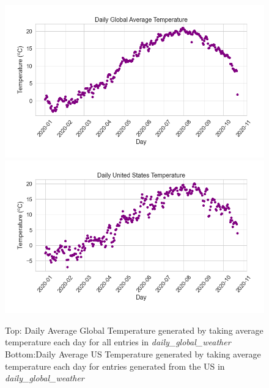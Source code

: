 \begin{figure}
    \centering
    \includegraphics[width=\columnwidth]{figures/DailyAveTemp.png}
    \includegraphics[width=\columnwidth]{figures/DailyAveUSTemp.png}
    \caption{Top: Daily Average Global Temperature generated by taking average temperature each day for all entries in \textit{daily\_global\_weather}\\Bottom:Daily Average US Temperature generated by taking average temperature each day for entries generated from the US in \textit{daily\_global\_weather}}
    \label{fig:US-bias}
\end{figure}
